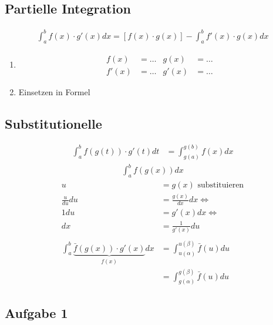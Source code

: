 \subsection{Partielle Integration}
\newcommand{\partielleIntegration}[4]{
    \begin{align*}
            f(x)&=#1 & g(x)&=#3\\
            f'(x)&=#2 & g'(x)&=#4
    \end{align*}
}
\newcommand{\partielleIntegrationNr}[4]{
    \begin{align*}
            \bar f(x)&=#1 & \bar g(x)&=#2\\
            \bar f'(x)&=#3 & \bar g'(x)&=#4
    \end{align*}
}
\begin{align*}
    \int_a^b f(x) \cdot g'(x) dx = \left[f(x) \cdot g(x)\right] - \int_a^b f'(x) \cdot g(x) dx
\end{align*}
\begin{enumerate}[label=\underline{\arabic*}]
    \item \partielleIntegration{\dots}{\dots}{\dots}{\dots}
    \item Einsetzen in Formel
\end{enumerate}

\subsection{Substitutionelle}
\begin{align*}
    \int_a^b f(g(t)) \cdot g'(t) dt &= \int_{g(a)}^{g(b)} f(x) dx
\end{align*}
\begin{align*}
    \int_a^b f(g(x)) dx
\end{align*}
\begin{align*}
    u &= g(x) \text{ substituieren}\\
    \frac{u}{du} du &= \frac{g(x)}{dx} dx \Leftrightarrow\\
    1du &= g'(x) dx \Leftrightarrow \\
    dx &= \frac{1}{g'(x)} du\\
    \\
    \int_a^b \underbrace{\bar f(g(x)) \cdot g'(x)}_{f(x)}dx
    &= \int_{u(\alpha)}^{u(\beta)} \bar f(u) du\\
    &= \int_{g(\alpha)}^{g(\beta)} \bar f(u) du
\end{align*}

\subsection{Aufgabe 1}

